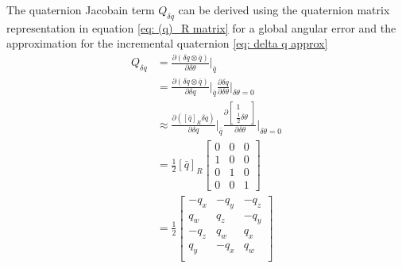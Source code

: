The quaternion Jacobain term $Q_{\delta q}$ can be derived using the quaternion matrix representation in equation \eqref{eq: (q)_R matrix} for a global angular error and the approximation for the incremental quaternion \eqref{eq: delta q approx}
\begin{equation}
    \begin{split}
        Q_{\delta q} &= \frac{\partial (\delta q \otimes \bar{q})}{\partial \delta \theta}\bigg|_{\bar{q}} \\
        &= \frac{\partial (\delta q \otimes \bar{q})}{\partial \delta q} \bigg|_{\bar{q}} \frac{\partial \delta q}{\partial \delta \theta} \bigg|_{\delta \theta = 0} \\
        &\approx \frac{\partial ([\bar{q}]_R \delta q)}{\partial \delta q} \bigg|_{\bar{q}} \frac{\partial \begin{bmatrix}
            1 \\
            \frac{1}{2} \delta \theta
        \end{bmatrix}}{\partial \delta \theta} \bigg|_{\delta \theta = 0} \\
        &= \frac{1}{2} [\bar{q}]_R \begin{bmatrix}
            0 & 0 & 0 \\
            1 & 0 & 0 \\
            0 & 1 & 0 \\
            0 & 0 & 1
        \end{bmatrix} \\
        &= \frac{1}{2} \begin{bmatrix}
            -q_x & -q_y & -q_z \\
            q_w & q_z & -q_y \\
            -q_z & q_w & q_x \\
            q_y & -q_x & q_w \\
        \end{bmatrix}
    \end{split}
    \label{eq: Q_ delta q derivation}
\end{equation}

